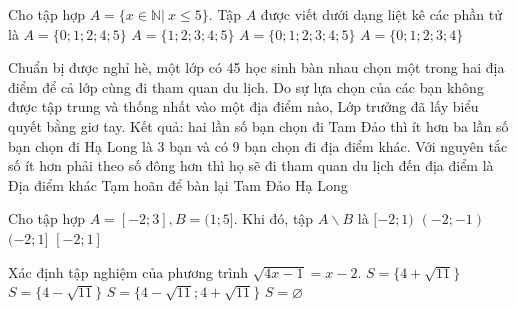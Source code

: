 \begin{ex}%
Cho tập hợp $A=\{x\in\mathbb N|\ x\le 5\}$. Tập $A$ được viết dưới dạng liệt kê các phần tử là
\choice
{$A=\{0;1;2;4;5\}$}
{$A=\{1;2;3;4;5\}$}
{\True $A=\{0;1;2;3;4;5\}$}
{$A=\{0;1;2;3;4\}$}
\end{ex}

\begin{ex}%
Chuẩn bị được nghỉ hè, một lớp có 45 học sinh bàn nhau chọn một trong hai địa điểm để cả lớp cùng đi tham quan du lịch. Do sự lựa chọn của các bạn không được tập trung và thống nhất vào một địa điểm nào, Lớp trưởng đã lấy biểu quyết bằng giơ tay. Kết quả: hai lần số bạn chọn đi Tam Đảo thì ít hơn ba lần số bạn chọn đi Hạ Long là 3 bạn và có 9 bạn chọn đi địa điểm khác. Với nguyên tắc số ít hơn phải theo số đông hơn thì họ sẽ đi tham quan du lịch đến địa điểm là
\choice
{Địa điểm khác}
{Tạm hoãn để bàn lại}
{\True Tam Đảo}
{Hạ Long}
\end{ex}

\begin{ex}%
Cho tập hợp $A=[-2;3],B=(1;5]$. Khi đó, tập $A\backslash B$ là
\choice
{$[-2;1)$}
{$(-2;-1)$}
{$(-2;1]$}
{\True $[-2;1]$}
\end{ex}

\begin{ex}%
Xác định tập nghiệm của phương trình $\sqrt{4x-1}=x-2$.
\choice
{\True $S=\{4+\sqrt{11}\}$}
{$S=\{4-\sqrt{11}\}$}
{$S=\{4-\sqrt{11};4+\sqrt{11}\}$}
{$S=\varnothing$}
\end{ex}

